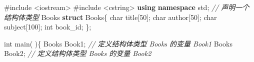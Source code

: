 \documentclass[
]{article}
\newenvironment{Shaded}{}{}
\newcommand{\CommentTok}[1]{\textcolor[rgb]{0.38,0.63,0.69}{\textit{#1}}}
\newcommand{\DataTypeTok}[1]{\textcolor[rgb]{0.56,0.13,0.00}{#1}}
\newcommand{\DecValTok}[1]{\textcolor[rgb]{0.25,0.63,0.44}{#1}}
\newcommand{\ImportTok}[1]{#1}
\newcommand{\KeywordTok}[1]{\textcolor[rgb]{0.00,0.44,0.13}{\textbf{#1}}}
\newcommand{\NormalTok}[1]{#1}
\newcommand{\OperatorTok}[1]{\textcolor[rgb]{0.40,0.40,0.40}{#1}}
\newcommand{\PreprocessorTok}[1]{\textcolor[rgb]{0.74,0.48,0.00}{#1}}
\begin{document}
\begin{Shaded}
\begin{Highlighting}[]
\PreprocessorTok{\#include }\ImportTok{\textless{}iostream\textgreater{}}
\PreprocessorTok{\#include }\ImportTok{\textless{}cstring\textgreater{}}
\KeywordTok{using} \KeywordTok{namespace}\NormalTok{ std}\OperatorTok{;} 
\CommentTok{// 声明一个结构体类型 }
\NormalTok{Books }\KeywordTok{struct}\NormalTok{ Books}\OperatorTok{\{}
   \DataTypeTok{char}\NormalTok{  title}\OperatorTok{[}\DecValTok{50}\OperatorTok{];}   
   \DataTypeTok{char}\NormalTok{  author}\OperatorTok{[}\DecValTok{50}\OperatorTok{];}   
   \DataTypeTok{char}\NormalTok{  subject}\OperatorTok{[}\DecValTok{100}\OperatorTok{];}   
   \DataTypeTok{int}\NormalTok{   book\_id}\OperatorTok{;}
\OperatorTok{\};} 

\DataTypeTok{int}\NormalTok{ main}\OperatorTok{(} \OperatorTok{)\{}
\NormalTok{   Books Book1}\OperatorTok{;}        \CommentTok{// 定义结构体类型 Books 的变量 Book1}
\NormalTok{   Books Book2}\OperatorTok{;}        \CommentTok{// 定义结构体类型 Books 的变量 Book2}
 

\end{Highlighting}
\end{Shaded}
\end{document}
